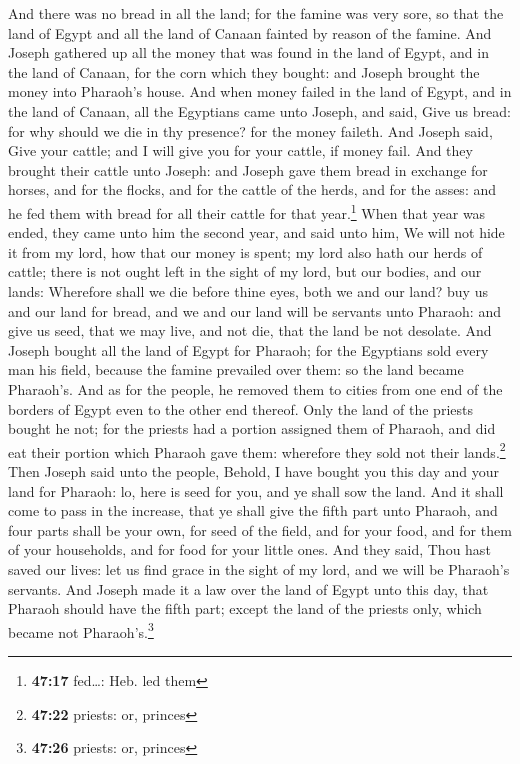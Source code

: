  And there was no bread in all the land; for the famine
was very sore, so that the land of Egypt and all the land of Canaan
fainted by reason of the famine.  And Joseph gathered up
all the money that was found in the land of Egypt, and in the land of
Canaan, for the corn which they bought: and Joseph brought the money
into Pharaoh's house.  And when money failed in the land
of Egypt, and in the land of Canaan, all the Egyptians came unto Joseph,
and said, Give us bread: for why should we die in thy presence? for the
money faileth.  And Joseph said, Give your cattle; and I
will give you for your cattle, if money fail.  And they
brought their cattle unto Joseph: and Joseph gave them bread in exchange
for horses, and for the flocks, and for the cattle of the herds, and for
the asses: and he fed them with bread for all their cattle for that
year.\footnote{\textbf{47:17} fed\ldots: Heb. led them} 
When that year was ended, they came unto him the second year, and said
unto him, We will not hide it from my lord, how that our money is spent;
my lord also hath our herds of cattle; there is not ought left in the
sight of my lord, but our bodies, and our lands: 
Wherefore shall we die before thine eyes, both we and our land? buy us
and our land for bread, and we and our land will be servants unto
Pharaoh: and give us seed, that we may live, and not die, that the land
be not desolate.  And Joseph bought all the land of Egypt
for Pharaoh; for the Egyptians sold every man his field, because the
famine prevailed over them: so the land became Pharaoh's.
 And as for the people, he removed them to cities from
one end of the borders of Egypt even to the other end thereof.
 Only the land of the priests bought he not; for the
priests had a portion assigned them of Pharaoh, and did eat their
portion which Pharaoh gave them: wherefore they sold not their
lands.\footnote{\textbf{47:22} priests: or, princes} 
Then Joseph said unto the people, Behold, I have bought you this day and
your land for Pharaoh: lo, here is seed for you, and ye shall sow the
land.  And it shall come to pass in the increase, that ye
shall give the fifth part unto Pharaoh, and four parts shall be your
own, for seed of the field, and for your food, and for them of your
households, and for food for your little ones.  And they
said, Thou hast saved our lives: let us find grace in the sight of my
lord, and we will be Pharaoh's servants.  And Joseph made
it a law over the land of Egypt unto this day, that Pharaoh should have
the fifth part; except the land of the priests only, which became not
Pharaoh's.\footnote{\textbf{47:26} priests: or, princes}


